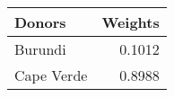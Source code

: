 \begin{tabular}{lr}
\toprule
    Donors &  Weights \\
\midrule
   Burundi &   0.1012 \\
Cape Verde &   0.8988 \\
\bottomrule
\end{tabular}
